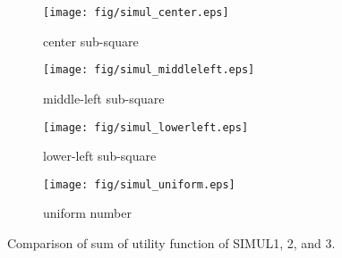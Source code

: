 	\begin{figure}
		\begin{center}
			\begin{subfigure}[b]{0.4\textwidth}
				\texttt{[image: fig/simul\_center.eps]}
				\caption{center sub-square}
				\label{figure:simul123_a}
			\end{subfigure}
			\begin{subfigure}[b]{0.4\textwidth}
				\texttt{[image: fig/simul\_middleleft.eps]}
				\caption{middle-left sub-square}
				\label{figure:simul123_b}
			\end{subfigure}
			\begin{subfigure}[b]{0.4\textwidth}
				\texttt{[image: fig/simul\_lowerleft.eps]}
				\caption{lower-left sub-square}
				\label{figure:simul123_c}
			\end{subfigure}
			\begin{subfigure}[b]{0.4\textwidth}
				\texttt{[image: fig/simul\_uniform.eps]}
				\caption{uniform number}
				\label{figure:simul123_d}
			\end{subfigure}
			\caption{Comparison of sum of utility function of SIMUL1, 2, and 3.}
			\label{figure:simul123}
		\end{center}
	\end{figure}
